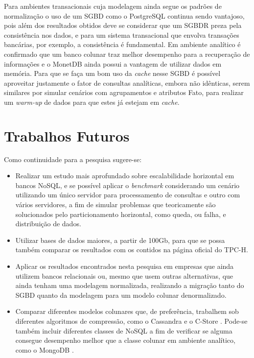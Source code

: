 Para ambientes transacionais cuja modelagem ainda segue os padrões de normalização o uso de um SGBD como o PostgreSQL continua sendo vantajoso, pois além dos resultados obtidos deve se considerar que um SGBDR preza pela consistência nos dados, e para um sistema transacional que envolva transações bancárias, por exemplo, a consistência é fundamental. Em ambiente analítico é confirmado que um banco colunar traz melhor desempenho para a recuperação de informações e o MonetDB ainda possui a vantagem de utilizar dados em memória. Para que se faça um bom uso da \textit{cache} nesse SGBD é possível aproveitar justamente o fator de consultas analíticas, embora não idênticas, serem similares por simular cenários com agrupamentos e atributos Fato, para realizar um \textit{warm-up} de dados para que estes já estejam em \textit{cache}.

\section{Trabalhos Futuros}

Como continuidade para a pesquisa sugere-se:

\begin{itemize}
    \item Realizar um estudo mais aprofundado sobre escalabilidade horizontal em bancos NoSQL, e se possível aplicar o \textit{benchmark} considerando um cenário utilizando um único servidor para processamento de consultas e outro com vários servidores, a fim de simular problemas que teoricamente são solucionados pelo particionamento horizontal, como queda, ou falha, e distribuição de dados.

    \item Utilizar bases de dados maiores, a partir de 100Gb, para que se possa também comparar os resultados com os contidos na página oficial do TPC-H.

    \item Aplicar os resultados encontrados nesta pesquisa em empresas que ainda utilizem bancos relacionais ou, mesmo que usem outras alternativas, que ainda tenham uma modelagem normalizada, realizando a migração tanto do SGBD quanto da modelagem para um modelo colunar denormalizado.

    \item Comparar diferentes modelos colunares que, de preferência, trabalhem sob diferentes algoritmos de compressão, como o Cassandra \cite{cassandra2018nosql} e o C-Store \cite{cstore2018nosql}. Pode-se também incluir diferentes classes de NoSQL a fim de verificar se alguma consegue desempenho melhor que a classe colunar em ambiente analítico, como o MongoDB \cite{mongo2018nosql}.

\end{itemize}
